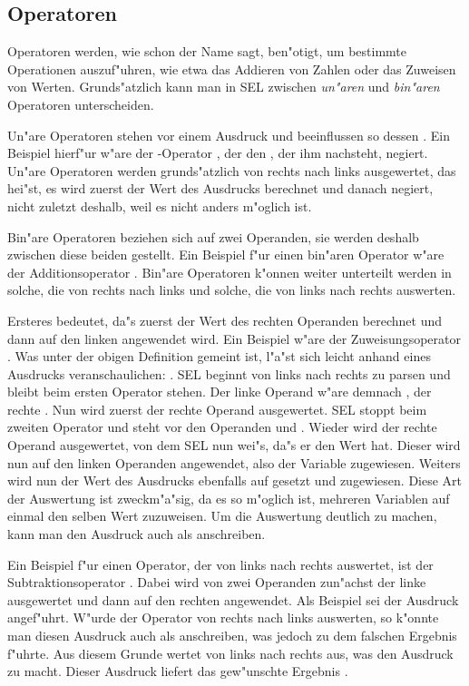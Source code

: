 \subsection{Operatoren}

Operatoren werden, wie schon der Name sagt, ben"otigt, um
bestimmte Operationen auszuf"uhren, wie etwa das Addieren
von Zahlen oder das Zuweisen von Werten. Grunds"atzlich kann man
in SEL zwischen {\em un"aren} und {\em bin"aren} Operatoren
unterscheiden.

Un"are Operatoren stehen vor einem Ausdruck und
beeinflussen so dessen . Ein Beispiel hierf"ur w"are der
-Operator \fu{!}, der den , der ihm nachsteht,
negiert. Un"are Operatoren werden grunds"atzlich von rechts nach
links ausgewertet, das hei"st, es wird zuerst der Wert des
Ausdrucks berechnet und danach negiert, nicht zuletzt deshalb,
weil es nicht anders m"oglich ist.

Bin"are Operatoren beziehen sich auf zwei Operanden, sie werden
deshalb zwischen diese beiden gestellt. Ein Beispiel f"ur einen
bin"aren Operator w"are der Additionsoperator \fu{+}. Bin"are
Operatoren k"onnen weiter unterteilt werden in solche, die von
rechts nach links und solche, die von links
nach rechts auswerten.

Ersteres bedeutet, da"s zuerst
der Wert des rechten Operanden berechnet und dann auf den
linken angewendet wird. Ein Beispiel w"are der Zuweisungsoperator
\fu{=}. Was unter der obigen Definition gemeint ist, l"a"st sich
leicht anhand eines Ausdrucks veranschaulichen: . SEL
beginnt von links nach rechts zu parsen und bleibt beim ersten
Operator stehen. Der linke Operand w"are demnach , der
rechte . Nun wird zuerst der rechte Operand ausgewertet.
SEL stoppt beim zweiten Operator und steht vor den Operanden
 und . Wieder wird der rechte Operand ausgewertet,
von dem SEL nun wei"s, da"s er den Wert  hat. Dieser wird
nun auf den linken Operanden angewendet, also der Variable 
zugewiesen. Weiters wird nun der Wert des Ausdrucks 
ebenfalls auf  gesetzt und  zugewiesen. Diese Art der
Auswertung ist zweckm"a"sig, da es so m"oglich ist, mehreren
Variablen auf einmal den selben Wert zuzuweisen. Um die
Auswertung deutlich zu machen, kann man den Ausdruck auch als
 anschreiben.

Ein Beispiel f"ur einen Operator, der von links nach rechts
auswertet, ist der Subtraktionsoperator \fu{-}.
Dabei wird
von zwei Operanden zun"achst der linke ausgewertet und dann auf
den rechten angewendet. Als Beispiel sei der Ausdruck 
angef"uhrt. W"urde der Operator \fu{-} von rechts nach links
auswerten, so k"onnte man diesen Ausdruck auch als 
anschreiben, was jedoch zu dem falschen Ergebnis  f"uhrte.
Aus diesem Grunde wertet \fu{-} von links nach rechts aus,
was den Ausdruck zu  macht. Dieser Ausdruck liefert
das gew"unschte Ergebnis .


